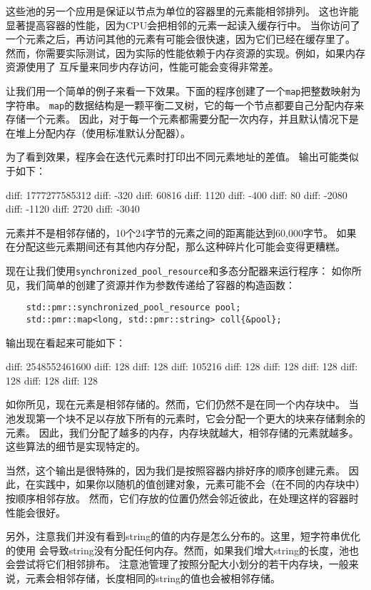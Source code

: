 这些池的另一个应用是保证以节点为单位的容器里的元素能相邻排列。
这也许能显著提高容器的性能，因为CPU会把相邻的元素一起读入缓存行中。
当你访问了一个元素之后，再访问其他的元素有可能会很快速，因为它们已经在缓存里了。
然而，你需要实际测试，因为实际的性能依赖于内存资源的实现。例如，如果内存资源使用了
互斥量来同步内存访问，性能可能会变得非常差。

让我们用一个简单的例子来看一下效果。下面的程序创建了一个\texttt{map}把整数映射为字符串。
\texttt{map}的数据结构是一颗平衡二叉树，它的每一个节点都要自己分配内存来存储一个元素。
因此，对于每一个元素都需要分配一次内存，并且默认情况下是在堆上分配内存（使用标准默认分配器）。

为了看到效果，程序会在迭代元素时打印出不同元素地址的差值。
输出可能类似于如下：
\begin{blacklisting}
    diff: 1777277585312
    diff: -320
    diff: 60816
    diff: 1120
    diff: -400
    diff: 80
    diff: -2080
    diff: -1120
    diff: 2720
    diff: -3040
\end{blacklisting}
元素并不是相邻存储的，10个24字节的元素之间的距离能达到60,000字节。
如果在分配这些元素期间还有其他内存分配，那么这种碎片化可能会变得更糟糕。

现在让我们使用\texttt{synchronized\_pool\_resource}和多态分配器来运行程序：
如你所见，我们简单的创建了资源并作为参数传递给了容器的构造函数：
\begin{lstlisting}
    std::pmr::synchronized_pool_resource pool;
    std::pmr::map<long, std::pmr::string> coll{&pool};
\end{lstlisting}
输出现在看起来可能如下：
\begin{blacklisting}
    diff: 2548552461600
    diff: 128
    diff: 128
    diff: 105216
    diff: 128
    diff: 128
    diff: 128
    diff: 128
    diff: 128
    diff: 128
\end{blacklisting}
如你所见，现在元素是相邻存储的。然而，它们仍然不是在同一个内存块中。
当池发现第一个块不足以存放下所有的元素时，它会分配一个更大的块来存储剩余的元素。
因此，我们分配了越多的内存，内存块就越大，相邻存储的元素就越多。
这些算法的细节是实现特定的。

当然，这个输出是很特殊的，因为我们是按照容器内排好序的顺序创建元素。
因此，在实践中，如果你以随机的值创建对象，元素可能不会（在不同的内存块中）按顺序相邻存放。
然而，它们存放的位置仍然会邻近彼此，在处理这样的容器时性能会很好。

另外，注意我们并没有看到string的值的内存是怎么分布的。这里，短字符串优化的使用
会导致string没有分配任何内存。然而，如果我们增大string的长度，池也会尝试将它们相邻排布。
注意池管理了按照分配大小划分的若干内存块，一般来说，元素会相邻存储，长度相同的string的值也会被相邻存储。

